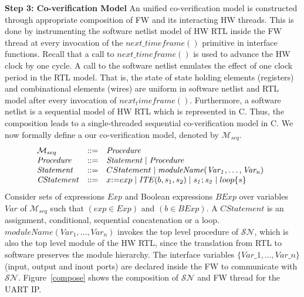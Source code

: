 \documentclass[sigconf]{acmart}
\begin{document}
\textbf{Step 3: Co-verification Model}
%
An unified co-verification model is constructed through appropriate composition of 
FW and its interacting HW threads.  This is done by instrumenting the 
software netlist model of HW RTL inside the FW thread at every invocation 
of the $next\_timeframe()$ primitive in interface functions.  Recall that a
call to $next\_timeframe()$ is used to advance the HW clock by one cycle.  A call
to the software netlist emulates the effect of one clock period in the RTL 
model. That is, the state of state holding elements (registers) and combinational 
elements (wires) are uniform in software netlist and RTL model after every invocation of 
$next_timeframe()$.  Furthermore, a software
netlist is a sequential model of HW RTL which is represented in C.  Thus, the
composition leads to a single-threaded sequential co-verification model in C.  
%
We now formally define a our co-verification model, denoted by 
$\mathcal{M}_{seq}$.
%
\[ 
\begin{array}[t]{@{}lll}
  \mathcal{M}_{seq} & {:}{:}{=} & \mathit{Procedure} \\
\mathit{Procedure} & {:}{:}{=} & \mathit{Statement} \mid \mathit{Procedure} \\
\mathit{Statement} & {:}{:}{=} & CStatement \mid \mathit{moduleName(Var_1,\dots,Var_n)} \\
\mathit{CStatement} & {:}{:}{=} & x {:}{=} exp \mid \mathit{ITE}(b, s_1,s_2) \mid \mathit{s_1;s_2} \mid loop\{s\} \\ 
\end{array}
\]
%
Consider sets of expressions $Exp$ and Boolean expressions $BExp$ 
over variables $Var$ of $\mathcal{M}_{seq}$ such that $(exp \in Exp)$ and 
$(b \in BExp)$. A $\mathit{CStatement}$ is an assignment,
conditional, sequential concatenation or a loop.
$\mathit{moduleName(Var_1,\dots,Var_n)}$ invokes the top level 
procedure of $\mathcal{SN}$, which is also the top level 
module of the HW RTL, since the translation from RTL to software preserves
the module hierarchy.  The interface variables $\{Var\_1,\dots,Var\_n\}$ 
(input, output and inout ports) are declared inside the 
FW to communicate with $\mathcal{SN}$.  Figure~\ref{compose} shows the 
composition of $\mathcal{SN}$ and FW thread for the UART IP.
%
%
\end{document}
